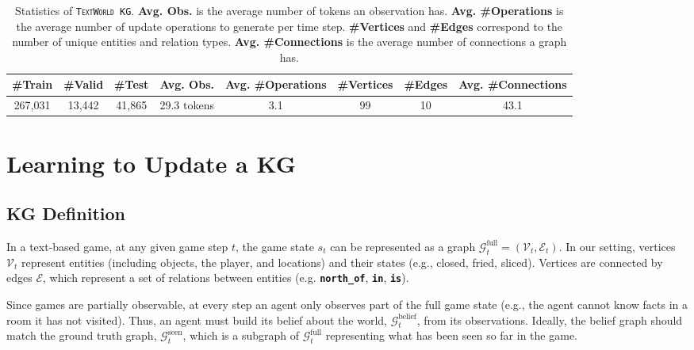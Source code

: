 \documentclass{article}
\newcommand{\code}[1]{\texttt{#1}}
\newcommand{\cmd}[1]{\textbf{\small{\code{#1}}}}
\newcommand{\twkg}{\texttt{\textsc{TextWorld KG}}\xspace}
\begin{document}
\begin{table}[h!]
    \centering
    \scriptsize
    \begin{tabular}{c|c|c||c|c||c|c|c}
        \toprule
        \#Train & \#Valid & \#Test & Avg. Obs. & Avg. \#Operations & \#Vertices & \#Edges & Avg. \#Connections \\
        \midrule
        267,031 & 13,442 & 41,865 & 29.3 tokens& 3.1 & 99 & 10 & 43.1 \\
        \bottomrule
    \end{tabular}
    \vspace{0.6em}
    \caption{Statistics of \twkg. \textbf{Avg. Obs.} is the average number of tokens an observation has. \textbf{Avg. \#Operations} is the average number of update operations to generate per time step. \textbf{\#Vertices} and \textbf{\#Edges} correspond to the number of unique entities and relation types. \textbf{Avg. \#Connections} is the average number of connections a graph has.}
    \label{tab:stats}
\end{table}


\section{Learning to Update a KG}
\label{section:learn_update_kg}

\subsection{KG Definition}
\label{section:kg_definition}

In a text-based game, at any given game step $t$, the game state $s_t$ can be represented as a graph $\mathcal{G}^\text{full}_t = (\mathcal{V}_t, \mathcal{E}_t)$. 
In our setting, vertices $\mathcal{V}_t$ represent entities (including objects, the player, and locations) and their states (e.g., closed, fried, sliced). 
Vertices are connected by edges $\mathcal{E}$, which represent a set of relations between entities (e.g. \cmd{north\_of}, \cmd{in}, \cmd{is}).

Since games are partially observable, at every step an agent only observes part of the full game state (e.g., the agent cannot know facts in a room it has not visited). 
Thus, an agent must build its belief about the world, $\mathcal{G}^\text{belief}_t$, from its observations. Ideally, the belief graph should match the ground truth graph, $\mathcal{G}^\text{seen}_t$, which is a subgraph of $\mathcal{G}^\text{full}_t$ representing what has been seen so far in the game.
\end{document}
